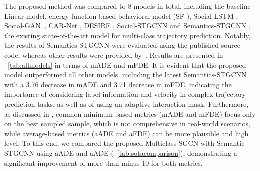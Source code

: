 \documentclass{article}
\begin{document}
The proposed method was compared to 8 models in total, including the baseline Linear model, energy function based behavioral model (SF \cite{Yamaguchi2011bm} ), Social-LSTM \cite{Alexandre2016lstm}, Social-GAN~\cite{gupta2018social}, CAR-Net \cite{sadeghian2017carnet}, DESIRE \cite{lee2017desire}, Social-STGCNN \cite{Mohamed2020socialstgcnn} and Semantics-STGCNN \cite{rainbow2021semanticsstgcnn}, the existing state-of-the-art model for multi-class trajectory prediction. Notably, the results of Semantics-STGCNN were evaluated using the published source code, whereas other results were provided by~\cite{rainbow2021semanticsstgcnn}. Results are presented in \tablename~\ref{tab:allmodels} in terms of mADE and mFDE. It is evident that the proposed model outperformed all other models, including the latest Semantics-STGCNN \cite{rainbow2021semanticsstgcnn} with a 3.76 decrease in mADE and 3.71 decrease in mFDE, indicating the importance of considering label information and velocity in complex trajectory prediction tasks, as well as of using an adaptive interaction mask. Furthermore, as discussed in \cite{rainbow2021semanticsstgcnn}, common minimum-based metrics (mADE and mFDE) focus only on the best sampled sample, which is not comprehensive in real-world scenarios, while average-based metrics (aADE and aFDE) can be more plausible and high level. To this end, we compared the proposed Multiclass-SGCN with Semantic-STGCNN using aADE and aADE (\tablename~\ref{tab:sotacomparison}), demonstrating a significant improvement of more than minus 10 for both metrics.


\begin{table}[t]
\caption{Performance comparison with the state-of-the-arts.}
\label{tab:allmodels}
\centering
{}
\end{table}
\end{document}
